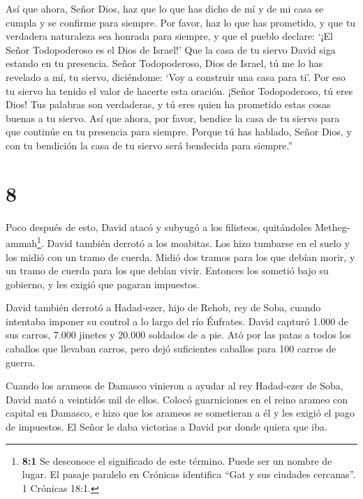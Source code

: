  Así que ahora, Señor Dios, haz que lo que has dicho de mí
y de mi casa se cumpla y se confirme para siempre. Por favor, haz lo que
has prometido,  y que tu verdadera naturaleza sea honrada
para siempre, y que el pueblo declare: `¡El Señor Todopoderoso es el
Dios de Israel!' Que la casa de tu siervo David siga estando en tu
presencia.  Señor Todopoderoso, Dios de Israel, tú me lo
has revelado a mí, tu siervo, diciéndome: `Voy a construir una casa para
ti'. Por eso tu siervo ha tenido el valor de hacerte esta oración.
 ¡Señor Todopoderoso, tú eres Dios! Tus palabras son
verdaderas, y tú eres quien ha prometido estas cosas buenas a tu siervo.
 Así que ahora, por favor, bendice la casa de tu siervo
para que continúe en tu presencia para siempre. Porque tú has hablado,
Señor Dios, y con tu bendición la casa de tu siervo será bendecida para
siempre.''

\hypertarget{section-7}{%
\section{8}\label{section-7}}

 Poco después de esto, David atacó y subyugó a los
filisteos, quitándoles Metheg-ammah\footnote{\textbf{8:1} Se desconoce
  el significado de este término. Puede ser un nombre de lugar. El
  pasaje paralelo en Crónicas identifica ``Gat y sus ciudades
  cercanas''. 1 Crónicas 18:1.}.  David también derrotó a
los moabitas. Los hizo tumbarse en el suelo y los midió con un tramo de
cuerda. Midió dos tramos para los que debían morir, y un tramo de cuerda
para los que debían vivir. Entonces los sometió bajo su gobierno, y les
exigió que pagaran impuestos.

 David también derrotó a Hadad-ezer, hijo de Rehob, rey de
Soba, cuando intentaba imponer su control a lo largo del río Éufrates.
 David capturó 1.000 de sus carros, 7.000 jinetes y 20.000
soldados de a pie. Ató por las patas a todos los caballos que llevaban
carros, pero dejó suficientes caballos para 100 carros de guerra.

 Cuando los arameos de Damasco vinieron a ayudar al rey
Hadad-ezer de Soba, David mató a veintidós mil de ellos. 
Colocó guarniciones en el reino arameo con capital en Damasco, e hizo
que los arameos se sometieran a él y les exigió el pago de impuestos. El
Señor le daba victorias a David por donde quiera que iba.

